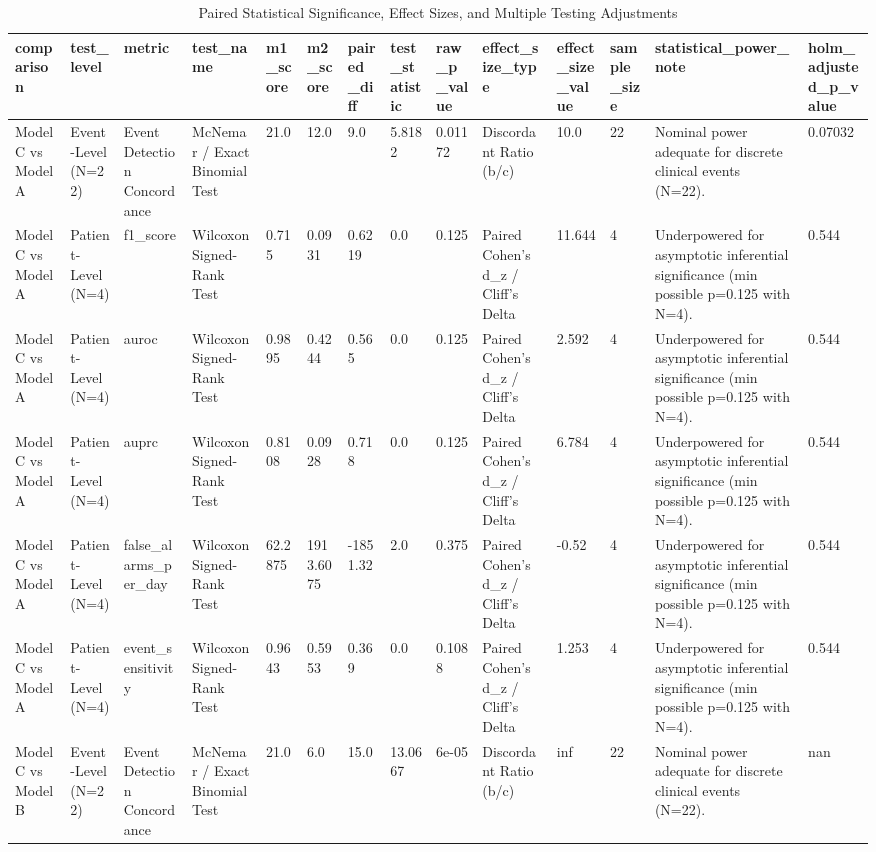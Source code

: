 \begin{table}[t]
\centering
\caption{Paired Statistical Significance, Effect Sizes, and Multiple Testing Adjustments}
\label{tab:statistical_robustness}
\small
\begin{tabular}{llllllllllllll}
\toprule
comparison & test\_level & metric & test\_name & m1\_score & m2\_score & paired\_diff & test\_statistic & raw\_p\_value & effect\_size\_type & effect\_size\_value & sample\_size & statistical\_power\_note & holm\_adjusted\_p\_value \\
\midrule
Model C vs Model A & Event-Level (N=22) & Event Detection Concordance & McNemar / Exact Binomial Test & 21.0 & 12.0 & 9.0 & 5.8182 & 0.01172 & Discordant Ratio (b/c) & 10.0 & 22 & Nominal power adequate for discrete clinical events (N=22). & 0.07032 \\
Model C vs Model A & Patient-Level (N=4) & f1\_score & Wilcoxon Signed-Rank Test & 0.715 & 0.0931 & 0.6219 & 0.0 & 0.125 & Paired Cohen's d\_z / Cliff's Delta & 11.644 & 4 & Underpowered for asymptotic inferential significance (min possible p=0.125 with N=4). & 0.544 \\
Model C vs Model A & Patient-Level (N=4) & auroc & Wilcoxon Signed-Rank Test & 0.9895 & 0.4244 & 0.565 & 0.0 & 0.125 & Paired Cohen's d\_z / Cliff's Delta & 2.592 & 4 & Underpowered for asymptotic inferential significance (min possible p=0.125 with N=4). & 0.544 \\
Model C vs Model A & Patient-Level (N=4) & auprc & Wilcoxon Signed-Rank Test & 0.8108 & 0.0928 & 0.718 & 0.0 & 0.125 & Paired Cohen's d\_z / Cliff's Delta & 6.784 & 4 & Underpowered for asymptotic inferential significance (min possible p=0.125 with N=4). & 0.544 \\
Model C vs Model A & Patient-Level (N=4) & false\_alarms\_per\_day & Wilcoxon Signed-Rank Test & 62.2875 & 1913.6075 & -1851.32 & 2.0 & 0.375 & Paired Cohen's d\_z / Cliff's Delta & -0.52 & 4 & Underpowered for asymptotic inferential significance (min possible p=0.125 with N=4). & 0.544 \\
Model C vs Model A & Patient-Level (N=4) & event\_sensitivity & Wilcoxon Signed-Rank Test & 0.9643 & 0.5953 & 0.369 & 0.0 & 0.1088 & Paired Cohen's d\_z / Cliff's Delta & 1.253 & 4 & Underpowered for asymptotic inferential significance (min possible p=0.125 with N=4). & 0.544 \\
Model C vs Model B & Event-Level (N=22) & Event Detection Concordance & McNemar / Exact Binomial Test & 21.0 & 6.0 & 15.0 & 13.0667 & 6e-05 & Discordant Ratio (b/c) & inf & 22 & Nominal power adequate for discrete clinical events (N=22). & nan \\

\end{tabular}
\end{table}
